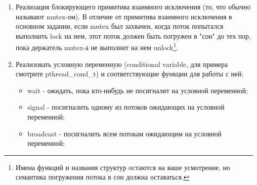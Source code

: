 \begin{enumerate}
  \item Реализация блокирующего примитива взаимного исключения (то, что обычно
        называют mutex-ом). В отличие от примитива взаимного исключения в
        основном задании, если mutex был захвачен, когда поток попытался
        выполнить lock на нем, этот поток должен быть погружен в "сон" до тех
        пор, пока держатель mutex-а не выполнит на нем unlock\footnote{Имена
        функций и названия структур остаются на ваше усмотрение, но семантика
        погружения потока в сон должна оставаться.}.
  \item Реализовать условную переменную (conditional variable, для примера
        смотрите pthread\_cond\_t) и соответствующие функции для работы с ней:
    \begin{itemize}
      \item wait - ожидать, пока кто-нибудь не посигналит на условной
            переменной;
      \item signal - посигналить одному из потоков ожидающих на условной
            переменной;
      \item broadcast - посигналить всем потокам ожидающим на условной
            переменной;
    \end{itemize}
\end{enumerate}
